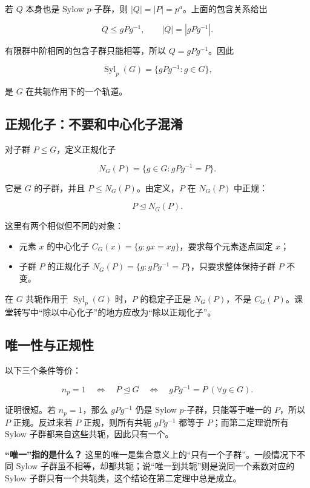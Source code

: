 若 $Q$ 本身也是 Sylow $p$-子群，则 $|Q|=|P|=p^a$。上面的包含关系给出

\[
Q\le gPg^{-1},\qquad |Q|=|gPg^{-1}|.
\]

有限群中阶相同的包含子群只能相等，所以 $Q=gPg^{-1}$。因此

\[
\operatorname{Syl}_p(G)=\{gPg^{-1}:g\in G\},
\]

是 $G$ 在共轭作用下的一个轨道。

\subsection{正规化子：不要和中心化子混淆}


对子群 $P\le G$，定义正规化子

\[
N_G(P)=\{g\in G:gPg^{-1}=P\}.
\]

它是 $G$ 的子群，并且 $P\le N_G(P)$。由定义，$P$ 在 $N_G(P)$ 中正规：

\[
P\trianglelefteq N_G(P).
\]

这里有两个相似但不同的对象：

\begin{itemize}
\item 元素 $x$ 的中心化子 $C_G(x)=\{g:gx=xg\}$，要求每个元素逐点固定 $x$；
\item 子群 $P$ 的正规化子 $N_G(P)=\{g:gPg^{-1}=P\}$，只要求整体保持子群 $P$ 不变。
\end{itemize}


在 $G$ 共轭作用于 $\operatorname{Syl}_p(G)$ 时，$P$ 的稳定子正是 $N_G(P)$，不是 $C_G(P)$。课堂转写中“除以中心化子”的地方应改为“除以正规化子”。

\subsection{唯一性与正规性}


以下三个条件等价：

\[
n_p=1
\quad\Longleftrightarrow\quad
P\trianglelefteq G
\quad\Longleftrightarrow\quad
gPg^{-1}=P\ (\forall g\in G).
\]

证明很短。若 $n_p=1$，那么 $gPg^{-1}$ 仍是 Sylow $p$-子群，只能等于唯一的 $P$，所以 $P$ 正规。反过来若 $P$ 正规，则所有共轭 $gPg^{-1}$ 都等于 $P$；而第二定理说所有 Sylow 子群都来自这些共轭，因此只有一个。

\textbf{“唯一”指的是什么？} 这里的唯一是集合意义上的“只有一个子群”。一般情况下不同 Sylow 子群虽不相等，却都共轭；说“唯一到共轭”则是说同一个素数对应的 Sylow 子群只有一个共轭类，这个结论在第二定理中总是成立。

